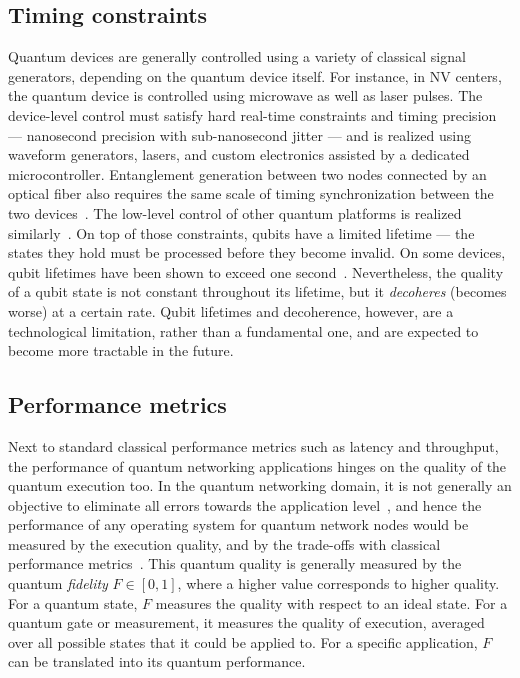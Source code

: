 \subsection{Timing constraints}

Quantum devices are generally controlled using a variety of classical signal generators, depending
on the quantum device itself. For instance, in NV centers, the quantum device is controlled using
microwave as well as laser pulses. The device-level control must satisfy hard real-time constraints
and timing precision --- nanosecond precision with sub-nanosecond jitter --- and is realized using
waveform generators, lasers, and custom electronics assisted by a dedicated microcontroller.
Entanglement generation between two nodes connected by an optical fiber also requires the same scale
of timing synchronization between the two devices~\cite{dahlberg_2019_egp,
pompili_2022_experimental}. The low-level control of other quantum platforms is realized
similarly~\cite{moehring_2007_ion_traps, reiserer_2015_neutral_atoms}. On top of those constraints,
qubits have a limited lifetime --- the states they hold must be processed before they become
invalid. On some devices, qubit lifetimes have been shown to exceed one
second~\cite{abobeih_2018_one_sec}. Nevertheless, the quality of a qubit state is not constant
throughout its lifetime, but it \emph{decoheres} (becomes worse) at a certain rate. Qubit lifetimes
and decoherence, however, are a technological limitation, rather than a fundamental one, and are
expected to become more tractable in the future.

\subsection{Performance metrics}

Next to standard classical performance metrics such as latency and throughput, the performance of
quantum networking applications hinges on the quality of the quantum execution too. In the quantum
networking domain, it is not generally an objective to eliminate all errors towards the application
level~\cite{dahlberg_2019_egp, vardoyan_2022_netarch}, and hence the performance of any operating
system for quantum network nodes would be measured by the execution quality, and by the trade-offs
with classical performance metrics~\cite{dahlberg_2019_egp, vardoyan_2022_netarch}. This quantum
quality is generally measured by the quantum \emph{fidelity} $F \in [0,1]$, where a higher value
corresponds to higher quality. For a quantum state, $F$ measures the quality with respect to an
ideal state. For a quantum gate or measurement, it measures the quality of execution, averaged over
all possible states that it could be applied to. For a specific application, $F$ can be translated
into its quantum performance.


